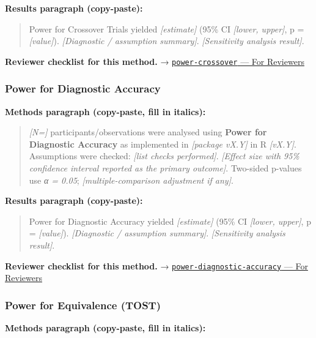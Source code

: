 \documentclass[
]{article}
\begin{document}
\textbf{Results paragraph (copy-paste):}

\begin{quote}
Power for Crossover Trials yielded \emph{{[}estimate{]}} (95\% CI
\emph{{[}lower, upper{]}}, p = \emph{{[}value{]}}). \emph{{[}Diagnostic
/ assumption summary{]}}. \emph{{[}Sensitivity analysis result{]}}.
\end{quote}

\textbf{Reviewer checklist for this method.} →
\href{../chapters/05-power/power-crossover.Rmd\#for-reviewers}{\texttt{power-crossover}
--- For Reviewers}

\subsubsection{Power for Diagnostic
Accuracy}\label{power-for-diagnostic-accuracy}

\textbf{Methods paragraph (copy-paste, fill in italics):}

\begin{quote}
\emph{{[}N={]}} participants/observations were analysed using
\textbf{Power for Diagnostic Accuracy} as implemented in
\emph{{[}package vX.Y{]}} in R \emph{{[}vX.Y{]}}. Assumptions were
checked: \emph{{[}list checks performed{]}}. \emph{{[}Effect size with
95\% confidence interval reported as the primary outcome{]}}. Two-sided
p-values use \emph{α = 0.05}; \emph{{[}multiple-comparison adjustment if
any{]}}.
\end{quote}

\textbf{Results paragraph (copy-paste):}

\begin{quote}
Power for Diagnostic Accuracy yielded \emph{{[}estimate{]}} (95\% CI
\emph{{[}lower, upper{]}}, p = \emph{{[}value{]}}). \emph{{[}Diagnostic
/ assumption summary{]}}. \emph{{[}Sensitivity analysis result{]}}.
\end{quote}

\textbf{Reviewer checklist for this method.} →
\href{../chapters/05-power/power-diagnostic-accuracy.Rmd\#for-reviewers}{\texttt{power-diagnostic-accuracy}
--- For Reviewers}

\subsubsection{Power for Equivalence
(TOST)}\label{power-for-equivalence-tost}

\textbf{Methods paragraph (copy-paste, fill in italics):}
\end{document}
